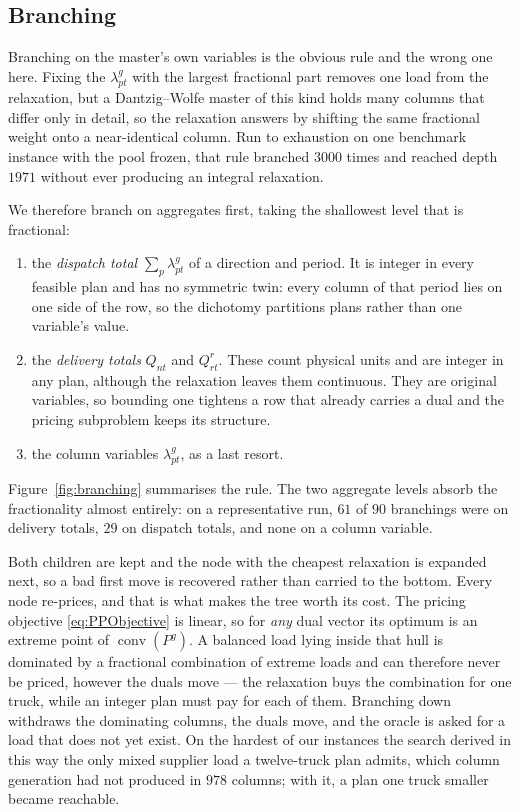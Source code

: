 \subsection{Branching}
\label{sec:branching}

Branching on the master's own variables is the obvious rule and the
wrong one here. Fixing the $\lambda^{g}_{pt}$ with the largest
fractional part removes one load from the relaxation, but a
Dantzig--Wolfe master of this kind holds many columns that differ only
in detail, so the relaxation answers by shifting the same fractional
weight onto a near-identical column. Run to exhaustion on one
benchmark instance with the pool frozen, that rule branched $3000$
times and reached depth $1971$ without ever producing an integral
relaxation.

We therefore branch on aggregates first, taking the shallowest level
that is fractional:
\begin{enumerate}
\item the \emph{dispatch total} $\sum_{p}\lambda^{g}_{pt}$ of a
  direction and period. It is integer in every feasible plan and has
  no symmetric twin: every column of that period lies on one side of
  the row, so the dichotomy partitions plans rather than one
  variable's value.
\item the \emph{delivery totals} $Q_{nt}$ and $Q^{r}_{rt}$. These
  count physical units and are integer in any plan, although the
  relaxation leaves them continuous. They are original variables, so
  bounding one tightens a row that already carries a dual and the
  pricing subproblem keeps its structure.
\item the column variables $\lambda^{g}_{pt}$, as a last resort.
\end{enumerate}
Figure~\ref{fig:branching} summarises the rule. The two aggregate levels absorb the fractionality almost entirely: on
a representative run, $61$ of $90$ branchings were on delivery totals,
$29$ on dispatch totals, and none on a column variable.

Both children are kept and the node with the cheapest relaxation is
expanded next, so a bad first move is recovered rather than carried to
the bottom. Every node re-prices, and that is what makes the tree
worth its cost. The pricing objective \eqref{eq:PPObjective} is
linear, so for \emph{any} dual vector its optimum is an extreme point
of $\operatorname{conv}(P^{g})$. A balanced load lying inside that
hull is dominated by a fractional combination of extreme loads and can
therefore never be priced, however the duals move --- the relaxation
buys the combination for one truck, while an integer plan must pay for
each of them. Branching down withdraws the dominating columns, the
duals move, and the oracle is asked for a load that does not yet
exist. On the hardest of our instances the search derived in this way
the only mixed supplier load a twelve-truck plan admits, which column
generation had not produced in $978$ columns; with it, a plan one
truck smaller became reachable.

